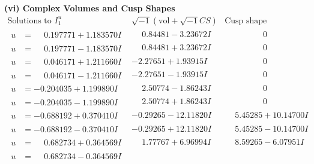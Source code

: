 \documentclass[1p]{elsarticle_modified}
\theoremstyle{definition}
\newcommand{\I}{\sqrt{-1}}
\begin{document}
\newpage\flushleft \textbf{(vi) Complex Volumes and Cusp Shapes}
$$\begin{array}{c|c|c}  
\text{Solutions to }I^u_{1}& \I (\text{vol} + \sqrt{-1}CS) & \text{Cusp shape}\\
 \hline 
\begin{aligned}
u &= \phantom{-}0.197771 + 1.183570 I\end{aligned}
 & \phantom{-}0.84481 - 3.23672 I & \phantom{-0.000000 } 0 \\ \hline\begin{aligned}
u &= \phantom{-}0.197771 - 1.183570 I\end{aligned}
 & \phantom{-}0.84481 + 3.23672 I & \phantom{-0.000000 } 0 \\ \hline\begin{aligned}
u &= \phantom{-}0.046171 + 1.211660 I\end{aligned}
 & -2.27651 + 1.93915 I & \phantom{-0.000000 } 0 \\ \hline\begin{aligned}
u &= \phantom{-}0.046171 - 1.211660 I\end{aligned}
 & -2.27651 - 1.93915 I & \phantom{-0.000000 } 0 \\ \hline\begin{aligned}
u &= -0.204035 + 1.199890 I\end{aligned}
 & \phantom{-}2.50774 - 1.86243 I & \phantom{-0.000000 } 0 \\ \hline\begin{aligned}
u &= -0.204035 - 1.199890 I\end{aligned}
 & \phantom{-}2.50774 + 1.86243 I & \phantom{-0.000000 } 0 \\ \hline\begin{aligned}
u &= -0.688192 + 0.370410 I\end{aligned}
 & -0.29265 - 12.11820 I & \phantom{-}5.45285 + 10.14700 I \\ \hline\begin{aligned}
u &= -0.688192 - 0.370410 I\end{aligned}
 & -0.29265 + 12.11820 I & \phantom{-}5.45285 - 10.14700 I \\ \hline\begin{aligned}
u &= \phantom{-}0.682734 + 0.364569 I\end{aligned}
 & \phantom{-}1.77767 + 6.96994 I & \phantom{-}8.59265 - 6.07951 I \\ \hline\begin{aligned}
u &= \phantom{-}0.682734 - 0.364569 I\end{aligned}

\end{array}$$
\end{document}
